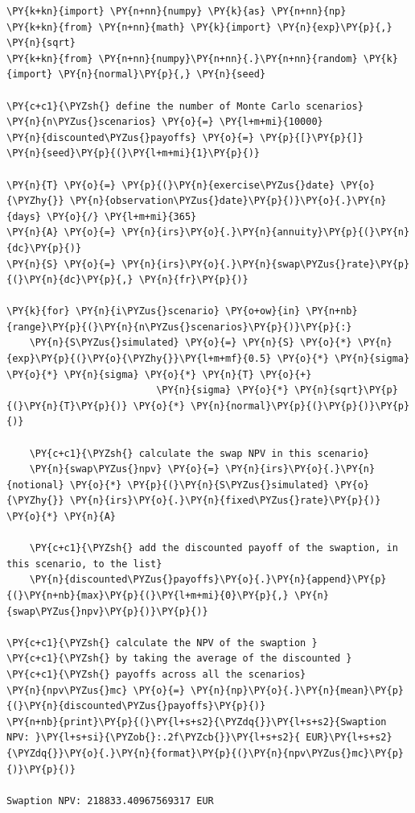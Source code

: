 \begin{tcolorbox}[breakable, size=fbox, boxrule=1pt, pad at break*=1mm,colback=cellbackground, colframe=cellborder]
\begin{Verbatim}[commandchars=\\\{\}]
\PY{k+kn}{import} \PY{n+nn}{numpy} \PY{k}{as} \PY{n+nn}{np}
\PY{k+kn}{from} \PY{n+nn}{math} \PY{k}{import} \PY{n}{exp}\PY{p}{,} \PY{n}{sqrt}
\PY{k+kn}{from} \PY{n+nn}{numpy}\PY{n+nn}{.}\PY{n+nn}{random} \PY{k}{import} \PY{n}{normal}\PY{p}{,} \PY{n}{seed}

\PY{c+c1}{\PYZsh{} define the number of Monte Carlo scenarios}
\PY{n}{n\PYZus{}scenarios} \PY{o}{=} \PY{l+m+mi}{10000}
\PY{n}{discounted\PYZus{}payoffs} \PY{o}{=} \PY{p}{[}\PY{p}{]}
\PY{n}{seed}\PY{p}{(}\PY{l+m+mi}{1}\PY{p}{)}

\PY{n}{T} \PY{o}{=} \PY{p}{(}\PY{n}{exercise\PYZus{}date} \PY{o}{\PYZhy{}} \PY{n}{observation\PYZus{}date}\PY{p}{)}\PY{o}{.}\PY{n}{days} \PY{o}{/} \PY{l+m+mi}{365}
\PY{n}{A} \PY{o}{=} \PY{n}{irs}\PY{o}{.}\PY{n}{annuity}\PY{p}{(}\PY{n}{dc}\PY{p}{)}
\PY{n}{S} \PY{o}{=} \PY{n}{irs}\PY{o}{.}\PY{n}{swap\PYZus{}rate}\PY{p}{(}\PY{n}{dc}\PY{p}{,} \PY{n}{fr}\PY{p}{)}
    
\PY{k}{for} \PY{n}{i\PYZus{}scenario} \PY{o+ow}{in} \PY{n+nb}{range}\PY{p}{(}\PY{n}{n\PYZus{}scenarios}\PY{p}{)}\PY{p}{:}
    \PY{n}{S\PYZus{}simulated} \PY{o}{=} \PY{n}{S} \PY{o}{*} \PY{n}{exp}\PY{p}{(}\PY{o}{\PYZhy{}}\PY{l+m+mf}{0.5} \PY{o}{*} \PY{n}{sigma} \PY{o}{*} \PY{n}{sigma} \PY{o}{*} \PY{n}{T} \PY{o}{+}
                          \PY{n}{sigma} \PY{o}{*} \PY{n}{sqrt}\PY{p}{(}\PY{n}{T}\PY{p}{)} \PY{o}{*} \PY{n}{normal}\PY{p}{(}\PY{p}{)}\PY{p}{)}
    
    \PY{c+c1}{\PYZsh{} calculate the swap NPV in this scenario}
    \PY{n}{swap\PYZus{}npv} \PY{o}{=} \PY{n}{irs}\PY{o}{.}\PY{n}{notional} \PY{o}{*} \PY{p}{(}\PY{n}{S\PYZus{}simulated} \PY{o}{\PYZhy{}} \PY{n}{irs}\PY{o}{.}\PY{n}{fixed\PYZus{}rate}\PY{p}{)} \PY{o}{*} \PY{n}{A}
    
    \PY{c+c1}{\PYZsh{} add the discounted payoff of the swaption, in this scenario, to the list}
    \PY{n}{discounted\PYZus{}payoffs}\PY{o}{.}\PY{n}{append}\PY{p}{(}\PY{n+nb}{max}\PY{p}{(}\PY{l+m+mi}{0}\PY{p}{,} \PY{n}{swap\PYZus{}npv}\PY{p}{)}\PY{p}{)}
    
\PY{c+c1}{\PYZsh{} calculate the NPV of the swaption }
\PY{c+c1}{\PYZsh{} by taking the average of the discounted }
\PY{c+c1}{\PYZsh{} payoffs across all the scenarios}
\PY{n}{npv\PYZus{}mc} \PY{o}{=} \PY{n}{np}\PY{o}{.}\PY{n}{mean}\PY{p}{(}\PY{n}{discounted\PYZus{}payoffs}\PY{p}{)}
\PY{n+nb}{print}\PY{p}{(}\PY{l+s+s2}{\PYZdq{}}\PY{l+s+s2}{Swaption NPV: }\PY{l+s+si}{\PYZob{}:.2f\PYZcb{}}\PY{l+s+s2}{ EUR}\PY{l+s+s2}{\PYZdq{}}\PY{o}{.}\PY{n}{format}\PY{p}{(}\PY{n}{npv\PYZus{}mc}\PY{p}{)}\PY{p}{)}

Swaption NPV: 218833.40967569317 EUR
\end{Verbatim}
\end{tcolorbox}

